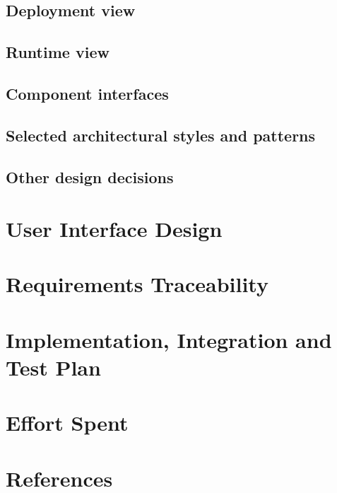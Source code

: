 \documentclass[a4paper]{article}
\begin{document}
\subsection{Deployment view}

\subsection{Runtime view}

\subsection{Component interfaces}

\subsection{Selected architectural styles and patterns}

\subsection{Other design decisions}

\section{User Interface Design}

\section{Requirements Traceability}

\section{Implementation, Integration and Test Plan}

\section{Effort Spent}

\section{References}
\end{document}
